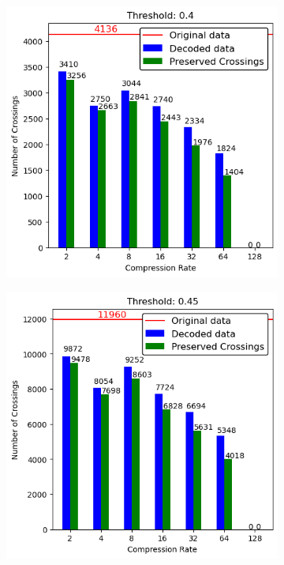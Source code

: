 \begin{appendices}
\begin{figure}
\begin{subfigure}{.5\textwidth}
	\end{subfigure}
	\hfill
	\begin{subfigure}{.5\textwidth}
		\includegraphics[width=\textwidth]{../../Images/spikes_threshold_04.png}
	\end{subfigure}
	\begin{subfigure}{.5\textwidth}
		\includegraphics[width=\textwidth]{../../Images/spikes_threshold_045.png}

\end{subfigure}
\end{figure}
\end{appendices}
